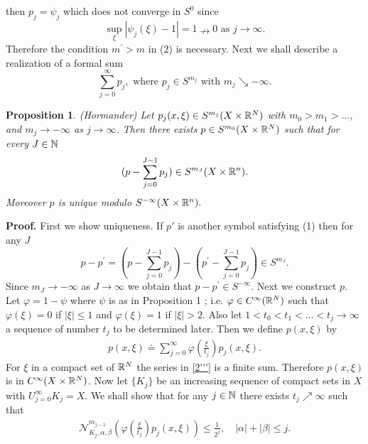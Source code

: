 \documentclass[12pt,reqno]{amsart}
\theoremstyle{plain}  %
\newtheorem{proposition}{Proposition}
\theoremstyle{definition}
\newcommand{\nin}{\noindent}
\newcommand{\vph}{\varphi}
\begin{document}
then $ p_j = \psi_j $ which does not converge in $ S^0 $ since
$$\sup_{\xi} |\psi_j (\xi) - 1| = 1
\nrightarrow 0 \text{ as } j \to \infty. $$
Therefore the condition $ m^\prime > m $ in (2)  is necessary.
Next we shall describe a realization of a formal sum
$$\sum^\infty_{j=0} p_j, \text{ where } p_j \in S^{m_j} \text{ with } m_j
\searrow - \infty.$$
\begin{proposition}(Hormander) 
	\label{prop2}
	Let $ p_j (x, \xi) \in S^{m_j}
(X \times \Bbb R^N) $ with $ m_0 > m_1> \dots$, and $ m_j
\longrightarrow - \infty $ as $ j \to \infty$.  Then there exists $ p \in
S^{m_0} (X \times \Bbb R^N) $ such that for every $ J \in \Bbb N $
\begin{equation}
	\begin{split}
		(p - \sum^{J-1}_{j=0} p_j) \in S^{m_J} (X \times {\Bbb R^n}). 
		\label{1'''}
	\end{split}
\end{equation}
Moreover $ p $ is unique modulo $ S^{- \infty} (X \times {\Bbb R^n}).$
\end{proposition}
\vskip0.1in
\nin
{\bf Proof.}  First we show uniqueness.  If $ p' $ is another symbol
satisfying (1) then for any $ J $
$$p - p^\prime = \left ( p - \sum^{J-1}_{j=0} p_j\right)  - \left (
p^\prime - \sum^{J-1}_{j=0} p_j \right ) \in S^{m_J}. $$
 Since $ m_J \to - \infty $ as
$ J \longrightarrow \infty $ we obtain that $ p - p^\prime \in S^{-
\infty}$.  Next we construct $ p$.  Let $ \vph = 1 - \psi $ where $ \psi $
is as in Proposition 1 ; i.e. $ \vph \in C^\infty (\Bbb R^N) $ such that $ \vph
(\xi) = 0 $ if $ |\xi| \le 1 $ and $ \vph (\xi) = 1 $ if $ |\xi | > 2 $.
Also let $ 1 < t_0 < t_1 < \dots < t_j \longrightarrow \infty $ a
sequence of number $ t_j $ to be determined later.  Then we define $
p(x, \xi)$ by
\begin{equation}
	\begin{split}
		p(x, \xi) \doteq \sum^\infty_{j=0} \vph ( \frac{\xi}{t_j} ) p_j (x, \xi).
		\label{2'''}
	\end{split}
\end{equation}
For $ \xi $ in a compact set of $ \Bbb R^N $ the series in \eqref{2'''} is a finite
sum.  Therefore $ p(x, \xi) $ is in $ C^\infty (X \times \Bbb R^N)$. Now
let $ \{K_j\} $ be an increasing sequence of compact sets in $ X $ with $
U^\infty_{j=0} K_j = X$.  We shall show that for any $ j \in \Bbb N $
there exists $ t_j \nearrow \infty $ such that
\begin{equation}
	\begin{split}
		\mathcal N^{m_{j-1}}_{K_j, \alpha, \beta} \left (\vph (\frac{\xi}{t_j}) p_j (x,
\xi)\right ) \le \frac{1}{2^j}, \quad  |\alpha| + |\beta| \le j. 
		\label{3'''}
	\end{split}
\end{equation}
\end{document}
